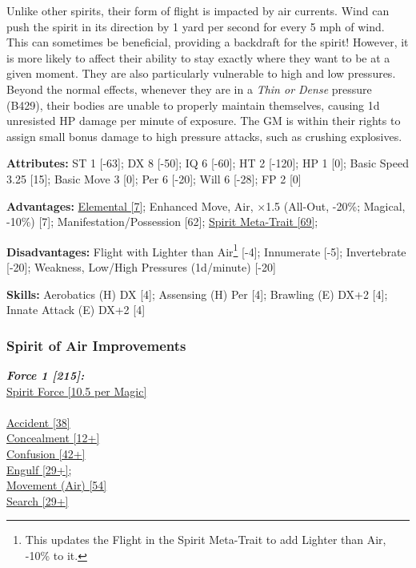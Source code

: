 \begin{multicols*}{3}
	Unlike other spirits, their form of flight is impacted by air currents. Wind can push the spirit in its direction by 1 yard per second for every 5 mph of wind. This can sometimes be beneficial, providing a backdraft for the spirit! However, it is more likely to affect their ability to stay exactly where they want to be at a given moment. They are also particularly vulnerable to high and low pressures. Beyond the normal effects, whenever they are in a \textit{Thin or Dense} pressure (B429), their bodies are unable to properly maintain themselves, causing 1d unresisted HP damage per minute of exposure. The GM is within their rights to assign small bonus damage to high pressure attacks, such as crushing explosives.
	
	\textbf{Attributes:}
	ST 1 [-63]; DX 8 [-50]; IQ 6 [-60]; HT 2 [-120]; HP 1 [0]; Basic Speed 3.25 [15]; Basic Move 3 [0]; Per 6 [-20]; Will 6 [-28]; FP 2 [0]
	
	\textbf{Advantages:}
	\hyperref[elemental]{Elemental [7]}; Enhanced Move, Air, \(\times\)1.5 (All-Out, -20\%; Magical, -10\%) [7]; Manifestation/Possession [62]; \hyperref[spirit_meta_trait]{Spirit Meta-Trait [69]}; 
	
	\textbf{Disadvantages:}
	Flight with Lighter than Air\footnote{This updates the Flight in the Spirit Meta-Trait to add Lighter than Air, -10\% to it.} [-4]; Innumerate [-5]; Invertebrate [-20]; Weakness, Low/High Pressures (1d/minute) [-20]
	
	\textbf{Skills:}
	Aerobatics (H) DX [4]; Assensing (H) Per [4]; Brawling (E) DX+2 [4]; Innate Attack (E) DX+2 [4]
	
	\subsubsection*{Spirit of Air Improvements}
	
	\textbf{\textit{Force 1 [215]:\\}}
	\hyperref[spirit_force]{Spirit Force [10.5 per Magic]}\\\\
	\hyperref[accident]{Accident [38]}\\
	\hyperref[concealment]{Concealment [12+]}\\
	\hyperref[confusion]{Confusion [42+]}\\
	\hyperref[engulf]{Engulf [29+];}\\
	\hyperref[movement]{Movement (Air) [54]}\\
	\hyperref[search]{Search [29+]}\\
	

\end{multicols*}
